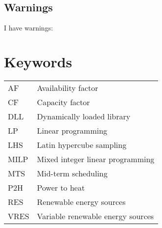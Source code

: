 \subsection*{Warnings}

I have  warnings:
\begin{itemize}
    \mylistwarnings{\item}
\end{itemize}

\newpage

\section*{Keywords}


\begin{table}[h!]
    \begin{tabular}{p{3cm} p{8cm}}
        AF & Availability factor \\
        CF & Capacity factor \\
        DLL & Dynamically loaded library \\
        LP & Linear programming \\
        LHS & Latin hypercube sampling \\
        MILP & Mixed integer linear programming \\
        MTS & Mid-term scheduling \\
        P2H & Power to heat \\
        RES & Renewable energy sources \\
        VRES & Variable renewable energy sources \\
    \end{tabular}
\end{table}

\newpage
